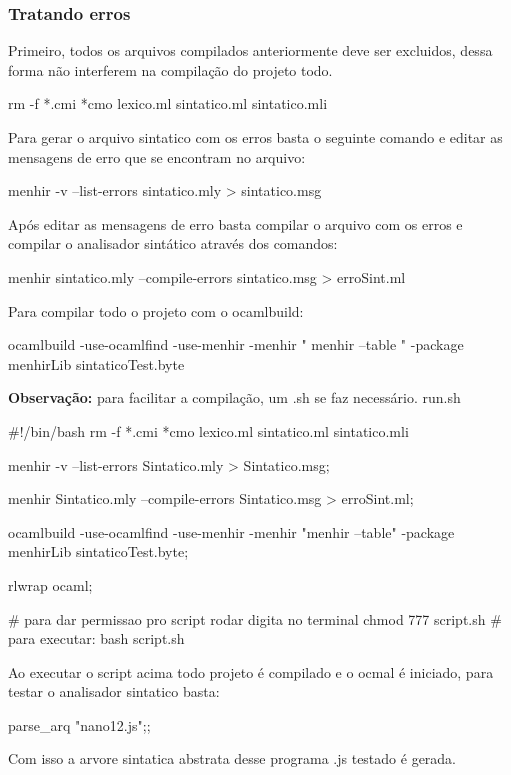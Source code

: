 \documentclass[12pt,a4paper,twoside]{article}
\begin{document}
\subsubsection{Tratando erros}
Primeiro, todos os arquivos compilados anteriormente deve ser excluidos, dessa forma não interferem na compilação do projeto todo.
\begin{terminal}
rm -f *.cmi *cmo lexico.ml sintatico.ml sintatico.mli
\end{terminal}
Para gerar o arquivo sintatico com os erros basta o seguinte comando e editar as mensagens de erro que se encontram no arquivo:
\begin{terminal}
menhir -v --list-errors sintatico.mly > sintatico.msg
\end{terminal}
Após editar as mensagens de erro basta compilar o arquivo com os erros e compilar o analisador sintático através dos comandos:
\begin{terminal}
menhir sintatico.mly --compile-errors sintatico.msg > erroSint.ml
\end{terminal}
Para compilar todo o projeto com o ocamlbuild:
\begin{terminal}
ocamlbuild -use-ocamlfind -use-menhir -menhir " menhir --table " -package menhirLib sintaticoTest.byte
\end{terminal}
\textbf{Observação: }
para facilitar a compilação, um .sh se faz necessário.\newline
run.sh
\begin{terminal}
#!/bin/bash
rm -f *.cmi *cmo lexico.ml sintatico.ml sintatico.mli

menhir -v --list-errors Sintatico.mly > Sintatico.msg;

menhir Sintatico.mly --compile-errors Sintatico.msg > erroSint.ml;

ocamlbuild -use-ocamlfind -use-menhir -menhir "menhir --table" -package menhirLib sintaticoTest.byte;

rlwrap ocaml;

# para dar permissao pro script rodar digita no terminal chmod 777 script.sh
# para executar: bash script.sh
\end{terminal}
Ao executar o script acima todo projeto é compilado e o ocmal é iniciado, para testar o analisador sintatico basta:
\begin{terminal}
parse_arq "nano12.js";;
\end{terminal}
Com isso a arvore sintatica abstrata desse programa .js testado é gerada.
\end{document}
